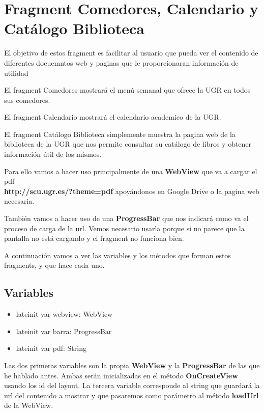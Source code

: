 \section{Fragment Comedores, Calendario y Catálogo Biblioteca}


El objetivo de estos fragment es facilitar al usuario que pueda ver el contenido de diferentes docuemntos web y paginas que le proporcionaran información de utilidad

El fragment Comedores mostrará el menú semanal que ofrece la UGR en todos sus comedores.

El fragment Calendario mostrará el calendario academico de la UGR.

El fragment Catálogo Biblioteca simplemente muestra la pagina web de la biblioteca de la UGR que nos permite consultar su catálogo de libros y obtener información útil de los mismos.

Para ello vamos a hacer uso principalmente de una \textbf{WebView} que va a cargar el pdf \\ \textbf{http://scu.ugr.es/?theme=pdf} apoyándonos en Google Drive o la pagina web necesaria.

También vamos a hacer uso de una \textbf{ProgressBar} que nos indicará como va el proceso de carga de la url. Vemos necesario usarla porque si no parece que la pantalla no está cargando y el fragment no funciona bien.

A continuación vamos a ver las variables y los métodos que forman estos fragments, y que hace cada uno.

\subsection{Variables}

\begin{itemize}

\item{lateinit var webview: WebView}
\item{lateinit var barra: ProgressBar}
\item{lateinit var pdf: String}

\end{itemize}

Las dos primeras variables son la propia \textbf{WebView} y la \textbf{ProgressBar} de las que he hablado antes. Ambas serán inicializadas en el método \textbf{OnCreateView} usando los id del layout.
La tercera variable corresponde al string que guardará la url del contenido a mostrar y que pasaremos como parámetro al método \textbf{loadUrl} de la WebView.

